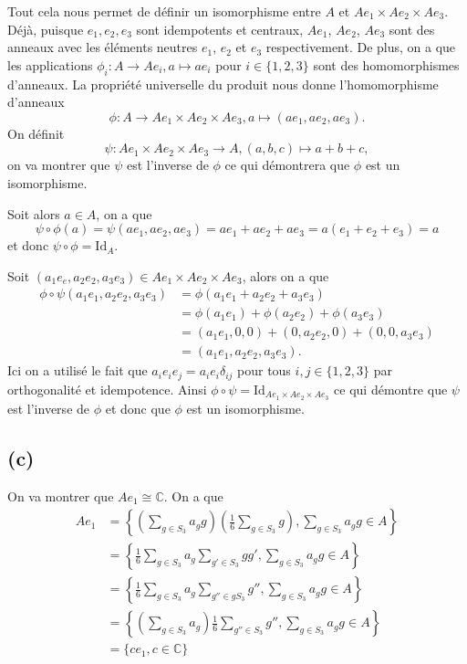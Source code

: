 \documentclass[french]{article}
\newcommand{\C}{\mathbb{C}}
\newcommand{\Id}{\mathrm{Id}}
\begin{document}
Tout cela nous permet de définir un isomorphisme entre $A$ et 
$Ae_1\times Ae_2 \times Ae_3$. Déjà, puisque $e_1, e_2, e_3$ sont idempotents et
centraux, $Ae_1$, $Ae_2$, $Ae_3$ sont des anneaux avec les éléments neutres
$e_1$, $e_2$ et $e_3$ respectivement. De plus, on a que les applications
$\phi_i: A \to Ae_i, a \mapsto ae_i$ pour $i \in \{1, 2, 3\}$ sont des
homomorphismes d'anneaux.
La propriété universelle du produit nous donne l'homomorphisme d'anneaux
\begin{equation*}
	\phi: A \to Ae_1\times Ae_2\times Ae_3, a \mapsto (ae_1, ae_2, ae_3).
\end{equation*}
On définit
\begin{equation*}
	\psi: Ae_1\times Ae_2\times Ae_3 \to A, (a, b, c) \mapsto a + b + c,
\end{equation*}
on va montrer que $\psi$ est l'inverse de $\phi$ ce qui démontrera que $\phi$
est un isomorphisme.

Soit alors $a \in A$,
on a que
\begin{equation*}
	\psi \circ \phi(a) = \psi(ae_1, ae_2, ae_3) = ae_1 + ae_2 + ae_3
	= a(e_1 + e_2 + e_3) = a
\end{equation*}
et donc $\psi \circ \phi = \Id_{A}$.

Soit $(a_1e_e, a_2e_2, a_3e_3) \in Ae_1\times Ae_2\times Ae_3$, alors on a que
\begin{align*}
	\phi\circ\psi(a_1e_1, a_2e_2, a_3e_3) &= \phi(a_1e_1 + a_2e_2 + a_3e_3)\\
	&= \phi(a_1e_1) + \phi(a_2e_2) + \phi(a_3e_3)\\
	&= (a_1e_1, 0, 0) + (0, a_2e_2, 0) + (0, 0, a_3e_3)\\
	&= (a_1e_1, a_2e_2, a_3e_3).
\end{align*}
Ici on a utilisé le fait que $a_ie_ie_j = a_ie_i\delta_{ij}$ pour tous $i, j
\in \{1, 2, 3\}$ par orthogonalité et idempotence. Ainsi $\phi\circ\psi = \Id_{Ae_1 \times Ae_2 \times Ae_3}$ ce qui démontre que
$\psi$ est l'inverse de $\phi$ et donc que $\phi$ est un isomorphisme.

\subsection*{(c)}
On va montrer que $Ae_1 \cong \C$. On a que
\begin{align*}
	Ae_1 &= \left\{\left(\sum_{g\in S_3}a_g g\right)\left(\frac{1}{6}
	\sum_{g \in S_3} g\right), \sum_{g \in S_3} a_g g \in A\right\}\\
	&= \left\{\frac{1}{6}\sum_{g\in S_3}a_g
	\sum_{g' \in S_3} gg', \sum_{g \in S_3} a_g g \in A\right\}\\
	&= \left\{\frac{1}{6}\sum_{g\in S_3}a_g
	\sum_{g'' \in gS_3} g'', \sum_{g \in S_3} a_g g \in A\right\}\\
	&= \left\{\left(\sum_{g\in S_3}a_g\right)\frac{1}{6}
	\sum_{g'' \in S_3} g'', \sum_{g \in S_3} a_g g \in A\right\}\\
	&= \{ce_1, c \in \C\}
\end{align*}
\end{document}
